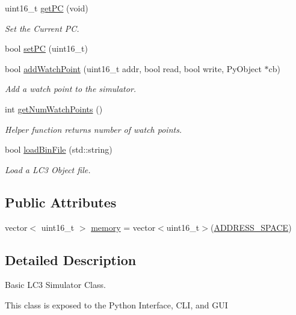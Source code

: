 \begin{DoxyCompactItemize}
uint16\-\_\-t \hyperlink{classsimulator_ada54a778a08fd580bf17ba2599f0bca6}{get\-P\-C} (void)
\begin{DoxyCompactList}\small\item\em Set the Current P\-C. \end{DoxyCompactList}\item 
bool \hyperlink{classsimulator_a20809a32770f874231c60dec97215728}{set\-P\-C} (uint16\-\_\-t)
\item 
bool \hyperlink{classsimulator_aac9ba2b60a6fcbd7ec0da971e0b7c93b}{add\-Watch\-Point} (uint16\-\_\-t addr, bool read, bool write, Py\-Object $\ast$cb)
\begin{DoxyCompactList}\small\item\em Add a watch point to the simulator. \end{DoxyCompactList}\item 
int \hyperlink{classsimulator_a2eaf15124121f4df2711370063436d76}{get\-Num\-Watch\-Points} ()
\begin{DoxyCompactList}\small\item\em Helper function returns number of watch points. \end{DoxyCompactList}\item 
bool \hyperlink{classsimulator_a6df3804bda4d00dab0859b1b143974c9}{load\-Bin\-File} (std\-::string)
\begin{DoxyCompactList}\small\item\em Load a L\-C3 Object file. \end{DoxyCompactList}\end{DoxyCompactItemize}
\subsection*{Public Attributes}
\begin{DoxyCompactItemize}
\item 
vector$<$ uint16\-\_\-t $>$ \hyperlink{classsimulator_a7c49313a87678b1737725b6bf695119d}{memory} = vector$<$uint16\-\_\-t$>$(\hyperlink{simulator_8hpp_aeacd5eb3350ee895e5e2f56398f1055c}{A\-D\-D\-R\-E\-S\-S\-\_\-\-S\-P\-A\-C\-E})
\end{DoxyCompactItemize}


\subsection{Detailed Description}
Basic L\-C3 Simulator Class. 

This class is exposed to the Python Interface, C\-L\-I, and G\-U\-I 

